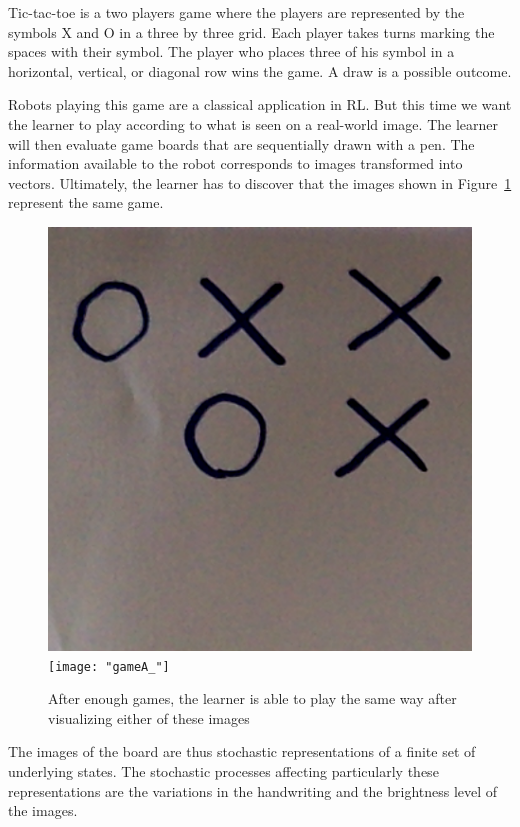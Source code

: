 \documentclass[scrartcl, 10.5 pt, conference]{ieeeconf}
\begin{document}
Tic-tac-toe is a two players game where the players are represented by the symbols X and O in a three by three grid. Each player takes turns marking the spaces with their symbol. The player who places three of his symbol in a horizontal, vertical, or diagonal row wins the game. A draw is a possible outcome.

Robots playing this game are a classical application in RL. But this time we want the learner to play according to what is seen on a real-world image. The learner will then evaluate game boards that are sequentially drawn with a pen. The information available to the robot corresponds to images transformed into vectors. Ultimately, the learner has to discover that the images shown in Figure~\ref{fig:gameA} represent the same game.

\begin{figure}
\begin{center}
\includegraphics[scale=.14]{"gameA"}
\texttt{[image: "gameA\_"]}
\caption{After enough games, the learner is able to play the same way after visualizing either of these images}
\label{fig:gameA}
\end{center}
\end{figure}

The images of the board are thus stochastic representations of a finite set of underlying states. The stochastic processes affecting particularly these representations are the variations in the handwriting and the brightness level of the images.
\end{document}
